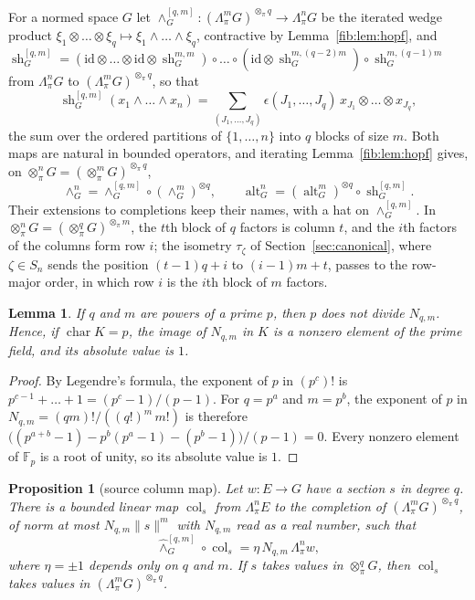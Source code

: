 \documentclass[11pt]{amsart}
\newtheorem{lemma}[theorem]{Lemma}
\newtheorem{proposition}[theorem]{Proposition}
\theoremstyle{definition}
\theoremstyle{remark}
\numberwithin{equation}{section}
\newcommand{\F}{\mathbb F}
\newcommand{\id}{\mathrm{id}}
\newcommand{\norm}[1]{\lVert #1\rVert}
\theoremstyle{plain}
\theoremstyle{definition}
\theoremstyle{plain}
\newcommand{\alt}{\operatorname{alt}}
\newcommand{\sh}{\operatorname{sh}}
\begin{document}
For a normed space $G$ let $\wedge^{[q,m]}_G\colon(\Lambda^m_\pi G)^{\otimes_\pi q}\to\Lambda^n_\pi G$ be the iterated
wedge product $\xi_1\otimes\dots\otimes\xi_q\mapsto\xi_1\wedge\dots\wedge\xi_q$, contractive by Lemma~\ref{fib:lem:hopf},
and $\sh^{[q,m]}_G=(\id\otimes\dots\otimes\id\otimes\sh^{m,m}_G)\circ\dots\circ(\id\otimes\sh^{m,(q-2)m}_G)\circ
\sh^{m,(q-1)m}_G$ from $\Lambda^n_\pi G$ to $(\Lambda^m_\pi G)^{\otimes_\pi q}$, so that
\[
 \sh^{[q,m]}_G(x_1\wedge\dots\wedge x_n)=\sum_{(J_1,\dots,J_q)}\epsilon(J_1,\dots,J_q)\,x_{J_1}\otimes\dots\otimes x_{J_q},
\]
the sum over the ordered partitions of $\{1,\dots,n\}$ into $q$ blocks of size $m$. Both maps are natural in bounded
operators, and iterating Lemma~\ref{fib:lem:hopf} gives, on $\otimes^n_\pi G=(\otimes^m_\pi G)^{\otimes_\pi q}$,
\begin{equation}\label{dgr:eq:iterated}
 \wedge^n_G=\wedge^{[q,m]}_G\circ(\wedge^m_G)^{\otimes q},\qquad
 \alt^n_G=(\alt^m_G)^{\otimes q}\circ\sh^{[q,m]}_G .
\end{equation}
Their extensions to completions keep their names, with a hat on $\wedge^{[q,m]}_G$. In
$\otimes^n_\pi G=(\otimes^q_\pi G)^{\otimes_\pi m}$, the $t$th block of $q$ factors is column $t$, and the $i$th factors of
the columns form row $i$; the isometry $\tau_\zeta$ of Section~\ref{sec:canonical}, where $\zeta\in S_n$ sends the position
$(t-1)q+i$ to $(i-1)m+t$, passes to the row-major order, in which row $i$ is the $i$th block of $m$ factors.

\begin{lemma}\label{dgr:lem:unit}
If $q$ and $m$ are powers of a prime $p$, then $p$ does not divide $N_{q,m}$. Hence, if $\operatorname{char}K=p$, the
image of $N_{q,m}$ in $K$ is a nonzero element of the prime field, and its absolute value is $1$.
\end{lemma}

\begin{proof}
By Legendre's formula, the exponent of $p$ in $(p^c)!$ is $p^{c-1}+\dots+1=(p^c-1)/(p-1)$. For $q=p^a$ and $m=p^b$, the
exponent of $p$ in $N_{q,m}=(qm)!/((q!)^m\,m!)$ is therefore
$\bigl((p^{a+b}-1)-p^b(p^a-1)-(p^b-1)\bigr)/(p-1)=0$. Every nonzero element of $\F_p$ is a root of unity, so its
absolute value is $1$.
\end{proof}

\begin{proposition}[source column map]\label{dgr:prop:s-column}
Let $w\colon E\to G$ have a section $s$ in degree $q$. There is a bounded linear map $\operatorname{col}_s$ from
$\Lambda^n_\pi E$ to the completion of $(\Lambda^m_\pi G)^{\otimes_\pi q}$, of norm at most $N_{q,m}\norm s^m$ with
$N_{q,m}$ read as a real number, such that
\[
 \widehat\wedge^{[q,m]}_G\circ\operatorname{col}_s=\eta\,N_{q,m}\,\Lambda^n_\pi w,
\]
where $\eta=\pm1$ depends only on $q$ and $m$. If $s$ takes values in $\otimes^q_\pi G$, then $\operatorname{col}_s$ takes
values in $(\Lambda^m_\pi G)^{\otimes_\pi q}$.
\end{proposition}
\end{document}
